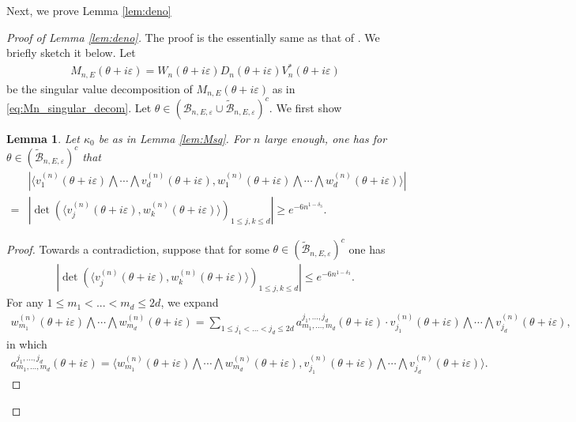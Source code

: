 \documentclass[11pt]{amsart}
\newtheorem{lemma}[theorem]{Lemma}
\begin{document}
Next, we prove Lemma \ref{lem:deno}
\begin{proof}[Proof of Lemma \ref{lem:deno}]
    The proof is the essentially same as that of \cite[Lemma 5.13]{HS3}. We briefly sketch it below.
    Let 
    \begin{align}\label{eq:M=WDV}
    M_{n,E}(\theta+i\varepsilon)=W_n(\theta+i\varepsilon)D_n(\theta+i\varepsilon)V_n^*(\theta+i\varepsilon)
    \end{align}
    be the singular value decomposition of $M_{n,E}(\theta+i\varepsilon)$ as in \eqref{eq:Mn_singular_decom}.
    Let $\theta\in (\mathcal{B}_{n,E,\varepsilon}\cup \tilde{\mathcal{B}}_{n,E,\varepsilon})^c$.
    We first show
    \begin{lemma}\label{lem:det_v1d_w1d}
    Let $\kappa_0$ be as in Lemma \ref{lem:Msq}. For $n$ large enough, one has for $\theta\in (\tilde{\mathcal{B}}_{n,E,\varepsilon})^c$ that 
    \begin{align}
        &|\langle v_{1}^{(n)}(\theta+i\varepsilon)\textstyle{\bigwedge}\cdots \textstyle{\bigwedge} v_{d}^{(n)}(\theta+i\varepsilon), w_{1}^{(n)}(\theta+i\varepsilon)\textstyle{\bigwedge}\cdots \textstyle{\bigwedge} w_{d}^{(n)}(\theta+i\varepsilon)\rangle|\\
        =&|\det (\langle v_{j}^{(n)}(\theta+i\varepsilon), w_{k}^{(n)}(\theta+i\varepsilon)\rangle)_{1\leq j,k\leq d}|\geq e^{-6n^{1-\delta_3}}.
    \end{align}
    \end{lemma}
    \begin{proof}
Towards a contradiction, suppose that for some $\theta\in (\tilde{\mathcal{B}}_{n,E,\varepsilon})^c$ one has
\begin{align}\label{eq:assume_a1-d_small}
|\det (\langle v_{j}^{(n)}(\theta+i\varepsilon), w_{k}^{(n)}(\theta+i\varepsilon)\rangle)_{1\leq j,k\leq d}|\leq e^{-6n^{1-\delta_3}}.
\end{align}
For any $1\leq m_1<...<m_d\leq 2d$, we expand
\begin{align}\label{eq:wedge_w=wedge_v}
    w_{m_1}^{(n)}(\theta+i\varepsilon)\textstyle{\bigwedge}\cdots\textstyle{\bigwedge} w_{m_d}^{(n)}(\theta+i\varepsilon)=\sum_{1\leq j_1<...<j_d\leq 2d} a^{j_1,...,j_d}_{m_1,...,m_d}(\theta+i\varepsilon) \cdot v_{j_1}^{(n)}(\theta+i\varepsilon)\textstyle{\bigwedge}\cdots\textstyle{\bigwedge} v_{j_d}^{(n)}(\theta+i\varepsilon),
\end{align}
in which
\begin{align}
    a^{j_1,...,j_d}_{m_1,...,m_d}(\theta+i\varepsilon)=\langle w_{m_1}^{(n)}(\theta+i\varepsilon)\textstyle{\bigwedge}\cdots\textstyle{\bigwedge}  w_{m_d}^{(n)}(\theta+i\varepsilon), v_{j_1}^{(n)}(\theta+i\varepsilon)\textstyle{\bigwedge}\cdots\textstyle{\bigwedge}  v_{j_d}^{(n)}(\theta+i\varepsilon)\rangle.

\end{align}
\end{proof}
\end{proof}
\end{document}
